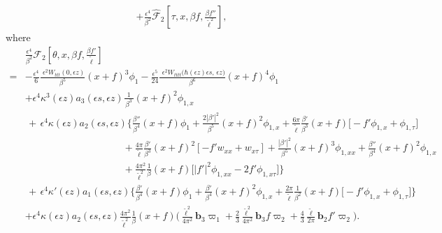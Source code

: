 \documentclass[10pt, reqno]{amsart}
\numberwithin{equation}{section}
\theoremstyle{definition}
\begin{document}
{{\begin{align}
 + \frac{\epsilon^4}{\beta^2} \hat{\mathcal F}_2\left[\tau, x, \beta f, \frac{\beta f''}{\tilde\ell^2} \right],
\end{align}
where
\begin{align} \label{mathcal F2}
& \frac{\epsilon^4}{\beta^2} \mathcal F_2\left[\theta, x, \beta f, \frac{\beta f'}{\tilde\ell}\right]
\nonumber\\[2mm]
=&
 - \frac{\epsilon^4}{6} \frac{\, \, \epsilon^2 W_{ttt}(0, \epsilon z)}{\beta^5} (x+f)^3 \phi_1
 -\frac{\epsilon^5}{24} \frac{\, \, \epsilon^2 W_{tttt}\big(\hbar(\epsilon z)\epsilon s, \, \epsilon z\big)}{\beta^6} (x+f)^4\phi_1
\nonumber\\[2mm]
&
 +\epsilon^4 \kappa^3(\epsilon z) a_3(\epsilon s, \epsilon z) \frac{1}{\, \beta^3\, }(x+f)^2\phi_{1, x}
\nonumber\\[2mm]
&\,+\,
\epsilon^4 \kappa(\epsilon z) a_2(\epsilon s, \epsilon z)
\Bigg\{
\frac{\beta''} {\beta^4} (x+f) \phi_1
+\frac{2|\beta'|^2}{\beta^5} (x+f)^2 \phi_{1, x}
+\frac{ 6\pi}{ {\tilde\ell}}\frac{\beta'} {\beta^3} (x+f)\big[-f'\phi_{1, x} +\phi_{1, \tau}\big]
\nonumber\\[2mm]
&\qquad\qquad\qquad\qquad\qquad
+\frac{ 4\pi}{ {\tilde\ell}}\frac{\beta'} {\beta^3} (x+f)^2[- f' w_{xx} +w_{x\tau}]
+ \frac{|\beta'|^2}{\beta^5} (x+f)^3\phi_{1, xx}
+ \frac{\beta''}{\beta^4} (x+f)^2 \phi_{1, x}
\nonumber\\[2mm]
&\qquad\qquad\qquad\qquad\qquad
+\frac{ 4\pi^2} {{\tilde\ell}^2}\frac{1}{\beta} (x+f)\big[ |f'|^2 \phi_{1, xx} -2f' \phi_{1, x\tau}\big]
\Bigg\}
\nonumber\\[2mm]
&\,+\,
\epsilon^4 \kappa'(\epsilon z)a_1(\epsilon s, \epsilon z)
\Bigg\{
\frac{\beta'}{\beta^4} (x+f)\phi_1
+\frac{\beta'}{\beta^4} (x+f)^2 \phi_{1, x}
+\frac{ 2\pi}{ {\tilde\ell}}\frac{1}{ \beta^2} (x+f)\big[-f'\phi_{1, x} +\phi_{1, \tau}\big]
\Bigg\}
\nonumber\\[2mm]
& + \epsilon^4 \kappa(\epsilon z) a_2(\epsilon s, \epsilon z) \frac{ 4\pi^2} {{\tilde\ell}^2}\frac{1}{\beta} (x+f) \Big(\frac{{\tilde\ell}^2}{4\pi^2} {\mathbf b}_3 \varpi_{1}
+
\frac{2}{3}\frac{{\tilde\ell}^2}{4\pi^2}{\mathbf b}_3 f \varpi_{2}
+
\frac{4}{3}\frac{{\tilde\ell}}{2\pi}{\mathbf b}_2f' \varpi_{2} \Big).
\end{align}




}}
\end{document}
